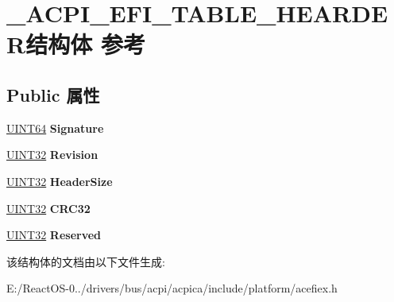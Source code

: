 \hypertarget{struct___a_c_p_i___e_f_i___t_a_b_l_e___h_e_a_r_d_e_r}{}\section{\+\_\+\+A\+C\+P\+I\+\_\+\+E\+F\+I\+\_\+\+T\+A\+B\+L\+E\+\_\+\+H\+E\+A\+R\+D\+E\+R结构体 参考}
\label{struct___a_c_p_i___e_f_i___t_a_b_l_e___h_e_a_r_d_e_r}
\subsection*{Public 属性}
\begin{DoxyCompactItemize}
\item 
\mbox{\label{struct___a_c_p_i___e_f_i___t_a_b_l_e___h_e_a_r_d_e_r_a445d613606579cb9db3d7917f01ea77e}} 
\hyperlink{_processor_bind_8h_a57be03562867144161c1bfee95ca8f7c}{U\+I\+N\+T64} {\bfseries Signature}
\item 
\mbox{\label{struct___a_c_p_i___e_f_i___t_a_b_l_e___h_e_a_r_d_e_r_af18f819a5ed2a219a6664d68e8b4c42a}} 
\hyperlink{_processor_bind_8h_ae1e6edbbc26d6fbc71a90190d0266018}{U\+I\+N\+T32} {\bfseries Revision}
\item 
\mbox{\label{struct___a_c_p_i___e_f_i___t_a_b_l_e___h_e_a_r_d_e_r_a3ccff7bb85a343a310dacbc477bae7a2}} 
\hyperlink{_processor_bind_8h_ae1e6edbbc26d6fbc71a90190d0266018}{U\+I\+N\+T32} {\bfseries Header\+Size}
\item 
\mbox{\label{struct___a_c_p_i___e_f_i___t_a_b_l_e___h_e_a_r_d_e_r_a7a9613f762507a994357e9550d520929}} 
\hyperlink{_processor_bind_8h_ae1e6edbbc26d6fbc71a90190d0266018}{U\+I\+N\+T32} {\bfseries C\+R\+C32}
\item 
\mbox{\label{struct___a_c_p_i___e_f_i___t_a_b_l_e___h_e_a_r_d_e_r_a1f6518f5848381f795c64ceae70ca9aa}} 
\hyperlink{_processor_bind_8h_ae1e6edbbc26d6fbc71a90190d0266018}{U\+I\+N\+T32} {\bfseries Reserved}
\end{DoxyCompactItemize}


该结构体的文档由以下文件生成\+:\begin{DoxyCompactItemize}
\item 
E\+:/\+React\+O\+S-\/0../drivers/bus/acpi/acpica/include/platform/acefiex.\+h\end{DoxyCompactItemize}
